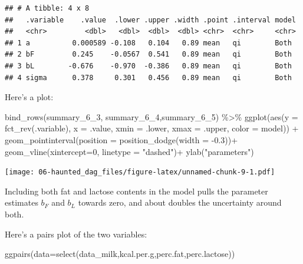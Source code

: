 \documentclass[
]{book}
\newenvironment{Shaded}{\begin{snugshade}}{\end{snugshade}}
\newcommand{\AttributeTok}[1]{\textcolor[rgb]{0.77,0.63,0.00}{#1}}
\newcommand{\DecValTok}[1]{\textcolor[rgb]{0.00,0.00,0.81}{#1}}
\newcommand{\FloatTok}[1]{\textcolor[rgb]{0.00,0.00,0.81}{#1}}
\newcommand{\FunctionTok}[1]{\textcolor[rgb]{0.00,0.00,0.00}{#1}}
\newcommand{\NormalTok}[1]{#1}
\newcommand{\SpecialCharTok}[1]{\textcolor[rgb]{0.00,0.00,0.00}{#1}}
\newcommand{\StringTok}[1]{\textcolor[rgb]{0.31,0.60,0.02}{#1}}
\begin{document}
\begin{verbatim}
## # A tibble: 4 x 8
##   .variable    .value  .lower .upper .width .point .interval model
##   <chr>         <dbl>   <dbl>  <dbl>  <dbl> <chr>  <chr>     <chr>
## 1 a          0.000589 -0.108   0.104   0.89 mean   qi        Both 
## 2 bF         0.245    -0.0567  0.541   0.89 mean   qi        Both 
## 3 bL        -0.676    -0.970  -0.386   0.89 mean   qi        Both 
## 4 sigma      0.378     0.301   0.456   0.89 mean   qi        Both
\end{verbatim}

Here's a plot:

\begin{Shaded}
\begin{Highlighting}[]
\FunctionTok{bind\_rows}\NormalTok{(summary\_6\_3, summary\_6\_4,summary\_6\_5) }\SpecialCharTok{\%\textgreater{}\%}
  \FunctionTok{ggplot}\NormalTok{(}\FunctionTok{aes}\NormalTok{(}\AttributeTok{y =} \FunctionTok{fct\_rev}\NormalTok{(.variable), }\AttributeTok{x =}\NormalTok{ .value, }\AttributeTok{xmin =}\NormalTok{ .lower, }\AttributeTok{xmax =}\NormalTok{ .upper, }\AttributeTok{color =}\NormalTok{ model)) }\SpecialCharTok{+}
  \FunctionTok{geom\_pointinterval}\NormalTok{(}\AttributeTok{position =} \FunctionTok{position\_dodge}\NormalTok{(}\AttributeTok{width =} \SpecialCharTok{{-}}\FloatTok{0.3}\NormalTok{))}\SpecialCharTok{+}
  \FunctionTok{geom\_vline}\NormalTok{(}\AttributeTok{xintercept=}\DecValTok{0}\NormalTok{, }\AttributeTok{linetype =} \StringTok{"dashed"}\NormalTok{)}\SpecialCharTok{+}
  \FunctionTok{ylab}\NormalTok{(}\StringTok{"parameters"}\NormalTok{)}
\end{Highlighting}
\end{Shaded}

\texttt{[image: 06-haunted\_dag\_files/figure-latex/unnamed-chunk-9-1.pdf]}

Including both fat and lactose contents in the model pulls the parameter estimates \(b_F\) and \(b_L\) towards zero, and about doubles the uncertainty around both.

Here's a pairs plot of the two variables:

\begin{Shaded}
\begin{Highlighting}[]
\FunctionTok{ggpairs}\NormalTok{(}\AttributeTok{data=}\FunctionTok{select}\NormalTok{(data\_milk,kcal.per.g,perc.fat,perc.lactose))}
\end{Highlighting}
\end{Shaded}
\end{document}
